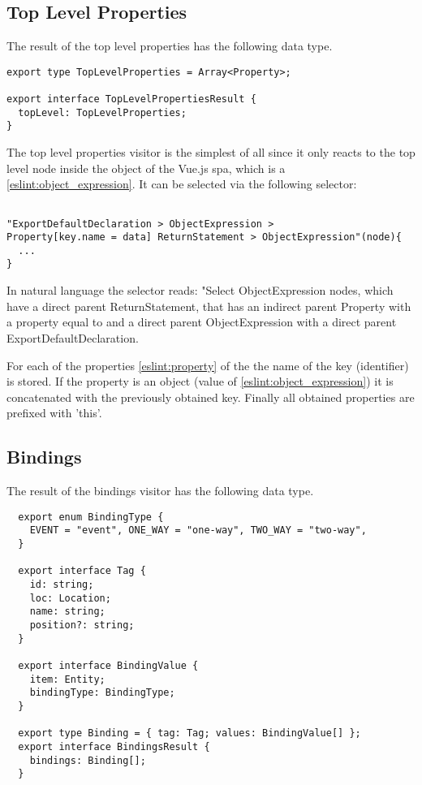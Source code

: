 \subsection{Top Level Properties}
The result of the top level properties has the following data type.
\begin{lstlisting}
export type TopLevelProperties = Array<Property>;

export interface TopLevelPropertiesResult {
  topLevel: TopLevelProperties;
}
\end{lstlisting}

The top level properties visitor is the simplest of all since it only reacts to the top level  node inside the  object  of the Vue.js \gls{spa}, which is a  \ref{eslint:object_expression}. It can be selected via the following selector:

\label{impl:top_level_select}
\begin{lstlisting}

"ExportDefaultDeclaration > ObjectExpression > 
Property[key.name = data] ReturnStatement > ObjectExpression"(node){
  ...
}
\end{lstlisting}
In natural language the selector reads: "Select ObjectExpression nodes, which have a direct parent ReturnStatement, that has an indirect parent Property with a property  equal to  and a direct parent ObjectExpression with a direct parent ExportDefaultDeclaration.

For each of the properties \ref{eslint:property} of the  the name of the key (identifier) is stored. If the property is an object (value of  \ref{eslint:object_expression}) it is concatenated with the previously obtained key. Finally all obtained properties are prefixed with 'this'.

\subsection{Bindings}
The result of the bindings visitor has the following data type.
\begin{lstlisting}
  export enum BindingType {
    EVENT = "event", ONE_WAY = "one-way", TWO_WAY = "two-way",
  }
  
  export interface Tag {
    id: string;
    loc: Location;
    name: string;
    position?: string;
  }
  
  export interface BindingValue {
    item: Entity;
    bindingType: BindingType;
  }
  
  export type Binding = { tag: Tag; values: BindingValue[] };
  export interface BindingsResult {
    bindings: Binding[];
  }
\end{lstlisting}

